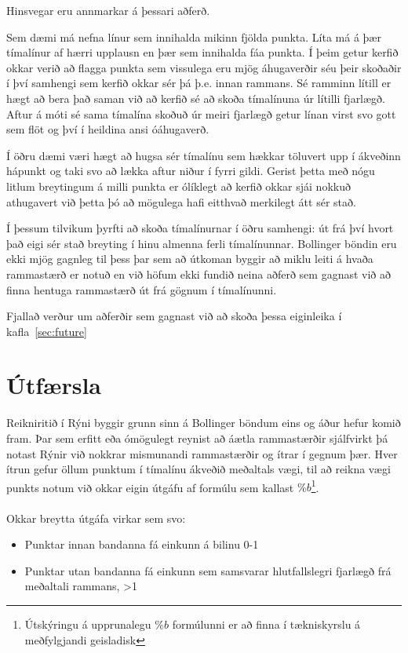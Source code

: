 \documentclass{article}
\begin{document}
Hinsvegar eru annmarkar á þessari aðferð.

Sem dæmi má nefna línur sem innihalda mikinn fjölda punkta.
Líta má á þær tímalínur af \ilqq hærri\irqq \hspace{1pt} upplausn en þær sem innihalda fáa punkta. Í
þeim getur kerfið okkar verið að flagga punkta sem vissulega eru mjög
áhugaverðir séu þeir skoðaðir í því samhengi sem kerfið okkar sér þá þ.e. innan
rammans. Sé ramminn lítill er hægt að bera það saman við að kerfið sé að skoða
tímalínuna úr lítilli fjarlægð. Aftur á móti sé sama tímalína skoðuð úr meiri
fjarlægð getur línan virst svo gott sem flöt og því í heildina ansi óáhugaverð.

Í öðru dæmi væri hægt að hugsa sér tímalínu sem hækkar töluvert upp í ákveðinn
hápunkt og taki svo að lækka aftur niður í fyrri gildi. Gerist þetta með nógu
litlum breytingum á milli punkta er ólíklegt að kerfið okkar sjái nokkuð
athugavert við þetta þó að mögulega hafi eitthvað merkilegt átt sér stað. 

Í þessum tilvikum þyrfti að skoða tímalínurnar í öðru samhengi: út frá því hvort
það eigi sér stað breyting í hinu almenna ferli tímalínunnar. Bollinger böndin
eru ekki mjög gagnleg til þess þar sem að útkoman byggir að miklu leiti á hvaða
rammastærð er notuð en við höfum ekki fundið neina aðferð sem gagnast við að
finna hentuga rammastærð út frá gögnum í tímalínunni.

Fjallað verður um aðferðir sem gagnast við að skoða þessa eiginleika í kafla~\ref{sec:future}

\section{Útfærsla}
\label{sec:imp_our}

Reikniritið í Rýni byggir grunn sinn á Bollinger böndum eins og áður hefur komið fram.
Þar sem erfitt eða ómögulegt reynist að áætla rammastærðir sjálfvirkt þá notast Rýnir við nokkrar mismunandi
rammastærðir og ítrar í gegnum þær. Hver ítrun gefur öllum punktum í tímalínu ákveðið meðaltals vægi, til að reikna
vægi punkts notum við okkar eigin útgáfu af formúlu sem kallast 
$\%b$\footnote[1]{Útskýringu á upprunalegu $\%b$ formúlunni er að finna í tækniskyrslu á meðfylgjandi geisladisk}. 
\\ \hfil
\\ \hfil
Okkar breytta útgáfa virkar sem svo:
\begin{itemize}
  \item Punktar innan bandanna fá einkunn á bilinu 0-1
  \item Punktar utan bandanna fá einkunn sem samsvarar hlutfallslegri fjarlægð frá meðaltali rammans, >1
\end{itemize}
\end{document}
